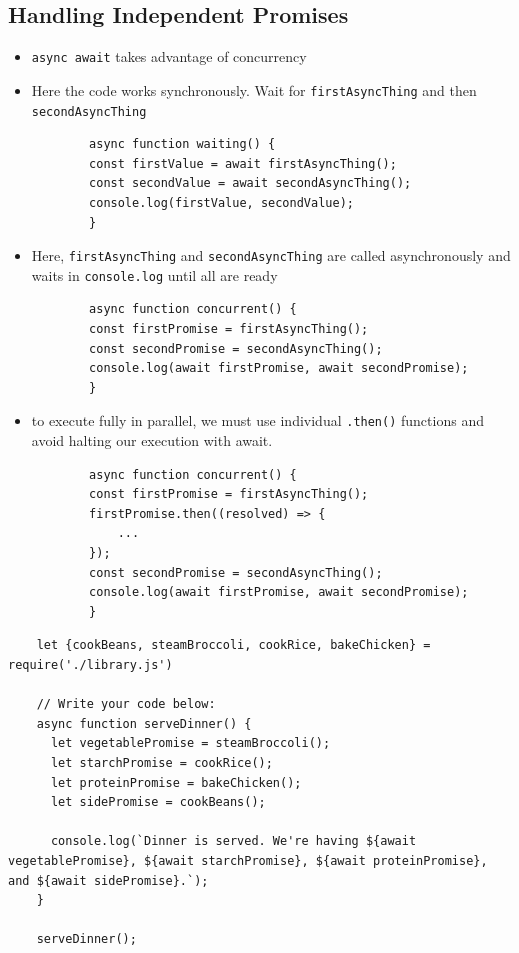 \documentclass[12pt]{article}
\begin{document}
\subsection{Handling Independent Promises}
\begin{itemize}
    \item \texttt{async await} takes advantage of concurrency
    \item Here the code works synchronously. Wait for \texttt{firstAsyncThing} and then \texttt{secondAsyncThing}
    \begin{lstlisting}
        async function waiting() {
        const firstValue = await firstAsyncThing();
        const secondValue = await secondAsyncThing();
        console.log(firstValue, secondValue);
        }
    \end{lstlisting}

    \item Here, \texttt{firstAsyncThing} and \texttt{secondAsyncThing} are called
    asynchronously and waits in \texttt{console.log} until all are ready
    \begin{lstlisting}
        async function concurrent() {
        const firstPromise = firstAsyncThing();
        const secondPromise = secondAsyncThing();
        console.log(await firstPromise, await secondPromise);
        }
    \end{lstlisting}

    \item to execute fully in parallel, we must use individual \texttt{.then()} functions and avoid halting our execution with await.

    \begin{lstlisting}
        async function concurrent() {
        const firstPromise = firstAsyncThing();
        firstPromise.then((resolved) => {
            ...
        });
        const secondPromise = secondAsyncThing();
        console.log(await firstPromise, await secondPromise);
        }
    \end{lstlisting}
\end{itemize}

\begin{lstlisting}
    let {cookBeans, steamBroccoli, cookRice, bakeChicken} = require('./library.js')

    // Write your code below:
    async function serveDinner() {
      let vegetablePromise = steamBroccoli();
      let starchPromise = cookRice();
      let proteinPromise = bakeChicken();
      let sidePromise = cookBeans();

      console.log(`Dinner is served. We're having ${await vegetablePromise}, ${await starchPromise}, ${await proteinPromise}, and ${await sidePromise}.`);
    }

    serveDinner();
\end{lstlisting}
\end{document}
